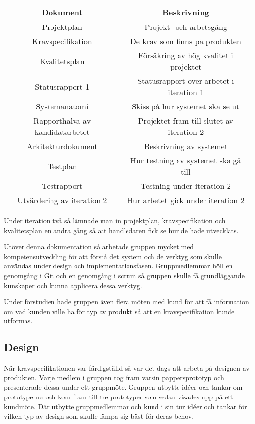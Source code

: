 \documentclass[a4paper,10pt]{article}
\begin{document}
\begin{center}
\begin{tabular}{|c|c|}
\hline
\textbf{Dokument} & \textbf{Beskrivning} \\
\hline
Projektplan & Projekt- och arbetsgång \\
\hline
Kravspecifikation & De krav som finns på produkten \\
\hline
Kvalitetsplan & Försäkring av hög kvalitet i projektet \\
\hline
Statusrapport 1 & Statusrapport över arbetet i iteration 1 \\
\hline
Systemanatomi & Skiss på hur systemet ska se ut \\
\hline
Rapporthalva av kandidatarbetet & Projektet fram till slutet av iteration 2 \\
\hline
Arkitekturdokument & Beskrivning av systemet \\
\hline
Testplan & Hur testning av systemet ska gå till \\
\hline
Testrapport & Testning under iteration 2 \\
\hline
Utvärdering av iteration 2 & Hur arbetet gick under iteration 2 \\
\hline
\end{tabular}
\end{center}

Under iteration två så lämnade man in projektplan, kravspecifikation och kvalitetsplan en andra gång så att handledaren fick se hur de hade utvecklats.

Utöver denna dokumentation så arbetade gruppen mycket med kompetensutveckling för att förstå det system och de verktyg som skulle användas under design och implementationsfasen. Gruppmedlemmar höll en genomgång i Git och en genomgång i scrum så gruppen skulle få grundläggande kunskaper och kunna applicera dessa verktyg.

Under förstudien hade gruppen även flera möten med kund för att få information om vad kunden ville ha för typ av produkt så att en kravspecifikation kunde utformas.

\subsection{Design}
När kravspecifikationen var färdigställd så var det dags att arbeta på designen av produkten. Varje medlem i gruppen tog fram varsin pappersprototyp och presenterade dessa under ett gruppmöte. Gruppen utbytte idéer och tankar om prototyperna och kom fram till tre prototyper som sedan visades upp på ett kundmöte. Där utbytte gruppmedlemmar och kund i sin tur idéer och tankar för vilken typ av design som skulle lämpa sig bäst för deras behov.
\end{document}

